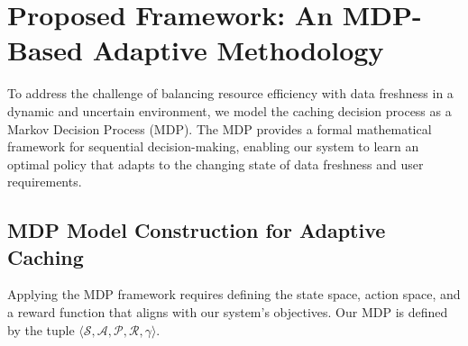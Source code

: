 \documentclass[journal]{IEEEtran}
\begin{document}
\section{Proposed Framework: An MDP-Based Adaptive Methodology}
\label{sec:mdp_framework}

To address the challenge of balancing resource efficiency with data freshness in a dynamic and uncertain environment, we model the caching decision process as a Markov Decision Process (MDP). The MDP provides a formal mathematical framework for sequential decision-making, enabling our system to learn an optimal policy that adapts to the changing state of data freshness and user requirements.

\subsection{MDP Model Construction for Adaptive Caching}
Applying the MDP framework requires defining the state space, action space, and a reward function that aligns with our system's objectives. Our MDP is defined by the tuple $\langle \mathcal{S}, \mathcal{A}, \mathcal{P}, \mathcal{R}, \gamma \rangle$.
\end{document}
